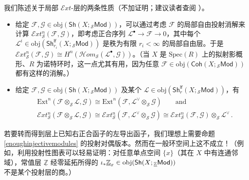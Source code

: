 \begin{Rem}\label{localExtRem}
我们陈述关于局部 $\mathcal{E}xt$-层的两条性质（不加证明；建议读者查阅 \cite[section III.6]{[Har77]}）。
\begin{itemize}[leftmargin=0.5cm]
	\item 给定 $\mathcal{F},\mathcal{G}\in\text{obj}(\mathsf{Sh}(X;{}_{\mathcal{S}}\mathsf{Mod}))$，可以通过考虑 $\mathcal{F}$ 的局部自由投射消解来计算 $\mathcal{E}xt_{\mathcal{S}}^n(\mathcal{F},\mathcal{G})$，即考虑正合序列 $\mathcal{L}^\bullet\rightarrow\mathcal{F}\rightarrow 0$，其中每个 $\mathcal{L}^i\in\text{obj}(\mathsf{Sh}^\mathsf{lf}_{r_i}(X;{}_{\mathcal{S}}\mathsf{Mod}))$ 是秩为有限 $r_i<\infty$ 的局部自由层。于是 $\mathcal{E}xt_{\mathcal{S}}^n(\mathcal{F},\mathcal{G})\cong H^n(\mathcal{H}om_\mathcal{S}(\mathcal{L}^\bullet,\mathcal{G}))$。（当 $X$ 是 $\text{Spec}(R)$ 上的拟射影概形、$R$ 为诺特环时，这一点尤其有用，因为任意 $\mathcal{F}\in\text{obj}(\mathsf{Coh}(X;{}_{\mathcal{S}}\mathsf{Mod}))$ 都有这样的消解。）
	
	\item 给定 $\mathcal{F},\mathcal{G}\in\text{obj}(\mathsf{Sh}(X;{}_{\mathcal{S}}\mathsf{Mod}))$ 及某个 $\mathcal{L}\in\text{obj}(\mathsf{Sh}^\mathsf{lf}_r(X;{}_{\mathcal{S}}\mathsf{Mod}))$，有
	\begin{align*}
		&\text{Ext}^n(\mathcal{F}\otimes_\mathcal{S}\mathcal{L},\mathcal{G})\cong \text{Ext}^n(\mathcal{F},\mathcal{L}^\vee\otimes_\mathcal{S}\mathcal{G})\qquad\text{and} \\
		&\mathcal{E}xt_\mathcal{S}^n(\mathcal{F}\otimes_\mathcal{S}\mathcal{L},\mathcal{G})\cong \mathcal{E}xt_\mathcal{S}^n(\mathcal{F},\mathcal{L}^\vee\otimes_\mathcal{S}\mathcal{G})\cong \mathcal{E}xt_\mathcal{S}^n(\mathcal{F},\mathcal{G})\otimes_\mathcal{S}\mathcal{L}^\vee\,.
	\end{align*}     
\end{itemize}
\end{Rem}

\vspace*{0.5cm}
\noindent 若要转而得到层上已知右正合函子的左导出函子，我们理想上需要命题 \ref{enoughinjectivemodules} 的投射对偶版本。然而在一般环空间上这不成立！（例如，利用投射性图表可以轻易证明：对任意单点空间 $\{x\}$（其在 $X$ 中有连通邻域），常值层 $\underline{\mathbb{Z}}$ 经零延拓所得的 $\iota_*\underline{\mathbb{Z}}_x\in\textup{obj}(\mathsf{Sh}(X;{}_{\underline{\mathbb{Z}}}\mathsf{Mod}))$ 不是某个投射层的商。）

